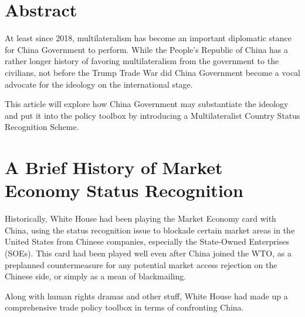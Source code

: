 



\fontsize{11pt}{12pt}\selectfont


\section*{Abstract}

At least since 2018, multilateralism has become an important diplomatic stance for China Government to perform. While the People's Republic of China has a rather longer history of favoring multilateralism from the government to the civilians, not before the Trump Trade War did China Government become a vocal advocate for the ideology on the international stage.

This article will explore how China Government may substantiate the ideology and put it into the policy toolbox by introducing a Multilateralist Country Status Recognition Scheme.




\section{A Brief History of Market Economy Status Recognition}

Historically, White House had been playing the Market Economy card with China, using the status recognition issue to blockade certain market areas in the United States from Chinese companies, especially the State-Owned Enterprises (SOEs). This card had been played well even after China joined the WTO, as a preplanned countermeasure for any potential market access rejection on the Chinese side, or simply as a mean of blackmailing.

Along with human rights dramas and other stuff, White House had made up a comprehensive trade policy toolbox in terms of confronting China.



